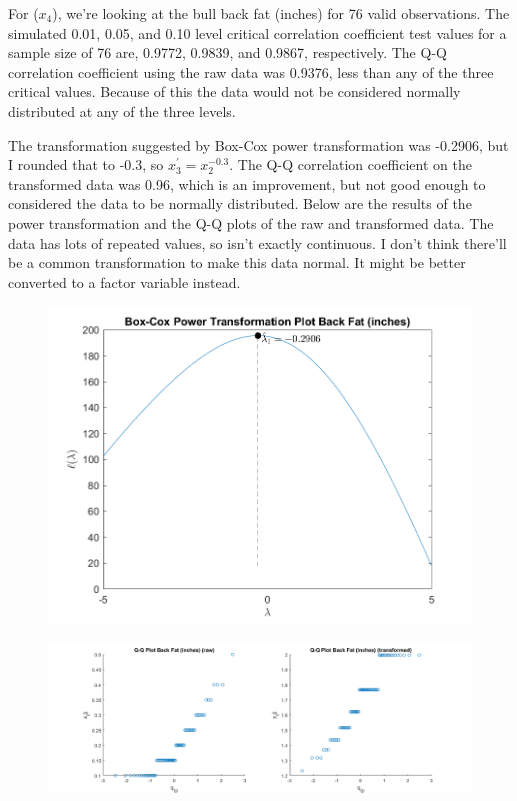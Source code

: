 For ($x_{4}$), we're looking at the bull back fat (inches) for 76 valid observations. The simulated 0.01, 0.05, and 0.10 level critical correlation coefficient test values for a sample size of 76 are, 0.9772, 0.9839, and 0.9867, respectively. The Q-Q correlation coefficient using the raw data was 0.9376, less than any of the three critical values. Because of this the data would not be considered normally distributed at any of the three levels.

The transformation suggested by Box-Cox power transformation was -0.2906, but I rounded that to -0.3, so $x_{3}^{\prime} = x_{2}^{-0.3}$.
The Q-Q correlation coefficient on the transformed data was 0.96, which is an improvement, but not good enough to considered the data to be normally distributed.
Below are the results of the power transformation and the Q-Q plots of the raw and transformed data.
The data has lots of repeated values, so isn't exactly continuous. I don't think there'll be a common transformation to make this data normal. It might be better converted to a factor variable instead.

\begin{center}
    \begin{figure}[H]
        \centering
        \includegraphics[scale=0.6]{./matlab/chapter-4/sol4.38.power.4.png}
    \end{figure}
\end{center}

\begin{center}
    \begin{figure}[H]
        \centering
        \includegraphics[scale=0.4]{./matlab/chapter-4/sol4.38.qq.4.png}
    \end{figure}
\end{center}

